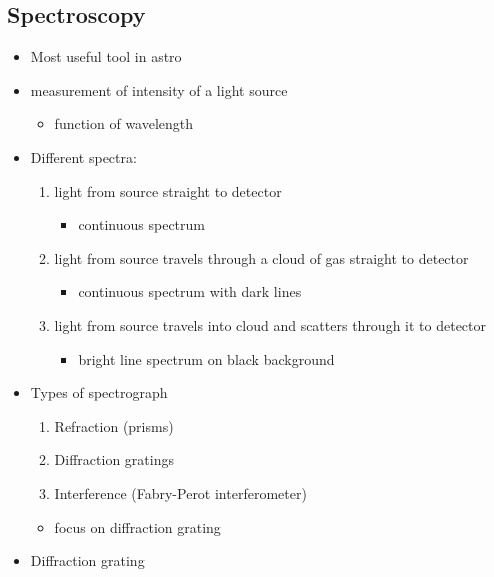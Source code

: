 \documentclass[a4paper,11pt,normalem]{article}
\begin{document}
\subsection{Spectroscopy}
\begin{itemize}
    \item Most useful tool in astro
    \item measurement of intensity of a light source
        \begin{itemize}
            \item function of wavelength
        \end{itemize}
    \item Different spectra:
        \begin{enumerate}
            \item light from source straight to detector
                \begin{itemize}
                    \item continuous spectrum
                \end{itemize}
            \item light from source travels through a cloud of gas straight to detector
                \begin{itemize}
                    \item continuous spectrum with dark lines
                \end{itemize}
            \item light from source travels into cloud and scatters through it to detector
                \begin{itemize}
                    \item bright line spectrum on black background
                \end{itemize}
        \end{enumerate}
    \item Types of spectrograph
        \begin{enumerate}
            \item Refraction (prisms)
            \item Diffraction gratings
            \item Interference (Fabry-Perot interferometer)
        \end{enumerate}
        \begin{itemize}
            \item focus on diffraction grating
        \end{itemize}
    \item Diffraction grating

\end{itemize}
\end{document}
